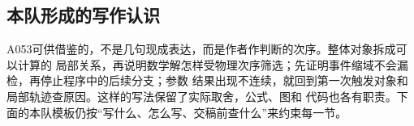 \subsection{本队形成的写作认识}

A053可供借鉴的，不是几句现成表达，而是作者作判断的次序。整体对象拆成可以计算的
局部关系，再说明数学解怎样受物理次序筛选；先证明事件缩域不会漏检，再停止程序中的后续分支；参数
结果出现不连续，就回到第一次触发对象和局部轨迹查原因。这样的写法保留了实际取舍，公式、图和
代码也各有职责。下面的本队模板仍按“写什么、怎么写、交稿前查什么”来约束每一节。

